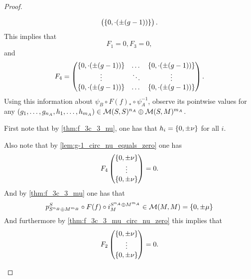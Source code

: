 \begin{proof}
\begin{enumerate}
{\[\begin{pmatrix}
                    \left\{ 0, \cdot(\pm(g - 1)) \right\}
                \end{pmatrix}.
            \]
            This implies that
            \[
                F_1 = 0, F_3 = 0,
            \]
            and
            \[
                F_4 = \begin{pmatrix}
                    \left\{ 0, \cdot(\pm(g - 1)) \right\} & \dots & \left\{ 0, \cdot(\pm(g - 1)) \right\} \\
                    \vdots & \ddots & \vdots \\
                    \left\{ 0, \cdot(\pm(g - 1)) \right\} & \dots & \left\{ 0, \cdot(\pm(g - 1)) \right\}
                \end{pmatrix}.
            \]
            Using this information about \( \psi_B \circ F(f)_* \circ \psi_A^{-1} \), observe its pointwise values for any \( \left( g_1, \dots, g_{n_A}, h_1, \dots, h_{m_A} \right) \in {\mathcal{M}}(S, S)^{n_A} \oplus {\mathcal{M}}(S, M)^{m_A} \).
            
            First note that by \autoref{thm:f_3c_3_nu}, one has that \( h_i = \left\{ 0, \pm \nu \right\} \) for all \( i \).

            Also note that by \autoref{lem:g-1_circ_nu_equals_zero} one has
            \[
                F_4 \begin{pmatrix}
                    \left\{ 0, \pm \nu \right\} \\
                    \vdots \\
                    \left\{ 0, \pm \nu \right\}
                \end{pmatrix} = 0.
            \]
            And by \autoref{thm:f_3c_3_mu} one has that
            \[
                p_{S^{n_B} \oplus M^{m_B}}^S \circ F(f) \circ i_M^{S^{n_A} \oplus M^{m_A}} \in {\mathcal{M}}(M, M) = \left\{ 0, \pm \mu \right\}
            \]
            And furthermore by \autoref{thm:f_3c_3_mu_circ_nu_zero} this implies that
            \[
                F_2 \begin{pmatrix}
                    \left\{ 0, \pm \nu \right\} \\
                    \vdots \\
                    \left\{ 0, \pm \nu \right\}
                \end{pmatrix} = 0.
            \]

}
\end{enumerate}
\end{proof}
